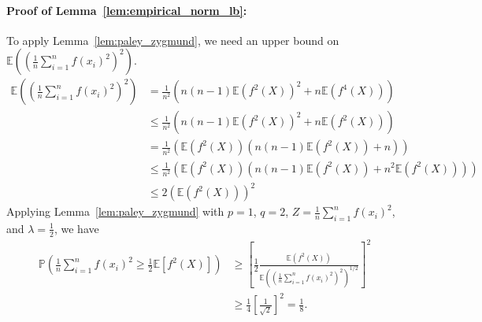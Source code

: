\documentclass{article}
\newcommand{\1}{\mathbf{1}}
\theoremstyle{alden}
\theoremstyle{aldenthm}
\theoremstyle{definition}
\theoremstyle{remark}
\begin{document}
\paragraph{Proof of Lemma~\ref{lem:empirical_norm_lb}:}
To apply Lemma~\ref{lem:paley_zygmund}, we need an upper bound on $\mathbb{E}((\frac{1}{n}\sum_{i = 1}^{n} f(x_i)^2)^2)$.
\begin{align*}
\mathbb{E}\left((\frac{1}{n}\sum_{i = 1}^{n} f(x_i)^2)^2\right) & = \frac{1}{n^2}\left(n(n - 1)\mathbb{E}(f^2(X))^2 + n\mathbb{E}(f^4(X)) \right) \\
& \leq \frac{1}{n^2}\left(n(n - 1)\mathbb{E}(f^2(X))^2 + n\mathbb{E}(f^2(X)) \right) \\
& = \frac{1}{n^2}\left(\mathbb{E}(f^2(X))\left(n(n -1)\mathbb{E}(f^2(X)) + n\right)\right) \\
& \leq \frac{1}{n^2}\left(\mathbb{E}(f^2(X))\left(n(n -1)\mathbb{E}(f^2(X)) + n^2\mathbb{E}(f^2(X))\right)\right) \\
& \leq 2 \left(\mathbb{E}(f^2(X))\right)^2
\end{align*}
Applying Lemma~\ref{lem:paley_zygmund} with $p = 1$, $q = 2$, $Z = \frac{1}{n}\sum_{i = 1}^{n} f(x_i)^2$, and $\lambda = \frac{1}{2}$, we have
\begin{align*}
\mathbb{P}\left(\frac{1}{n}\sum_{i = 1}^{n} f(x_i)^2 \geq \frac{1}{2}\mathbb{E}[f^2(X)] \right) & \geq \left[\frac{1}{2} \frac{\mathbb{E}(f^2(X))}{\mathbb{E}\left((\frac{1}{n}\sum_{i = 1}^{n} f(x_i)^2)^2\right)^{1/2}}\right]^2\\
& \geq \frac{1}{4} \left[\frac{1}{\sqrt{2}}\right]^2 = \frac{1}{8}.
\end{align*}
\end{document}

